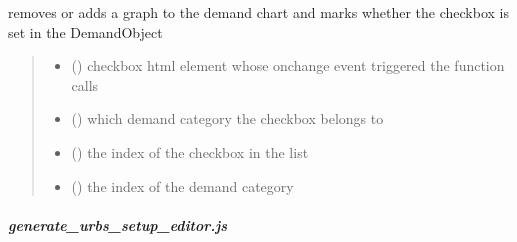 \documentclass[letterpaper,10pt,english]{sphinxmanual}
\begin{document}
\begin{fulllineitems}
\label{\detokenize{docs_gui/js_api/urbs_editor/demand_editor:check_uncheck_demand}}
\pysigstartsignatures
{}
\pysigstopsignatures
\sphinxAtStartPar
removes or adds a graph to the demand chart and marks whether the checkbox is set in the DemandObject
\begin{quote}\begin{description}
\begin{itemize}
\item {} 
\sphinxAtStartPar
{} () \textendash{} checkbox html element whose onchange event triggered the function calls

\item {} 
\sphinxAtStartPar
{} () \textendash{} which demand category the checkbox belongs to

\item {} 
\sphinxAtStartPar
{} () \textendash{} the index of the checkbox in the list

\item {} 
\sphinxAtStartPar
{} () \textendash{} the index of the demand category

\end{itemize}

\end{description}\end{quote}

\end{fulllineitems}


\sphinxstepscope


\subparagraph{generate\_urbs\_setup\_editor.js}
\label{\detokenize{docs_gui/js_api/urbs_editor/generate_urbs_setup_editor:generate-urbs-setup-editor-js}}\label{\detokenize{docs_gui/js_api/urbs_editor/generate_urbs_setup_editor::doc}}
\end{document}
